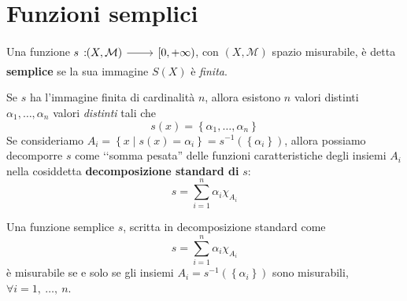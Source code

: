 \section{Funzioni semplici}
\begin{define}
Una funzione $\funz{s}{\left(X,\mathcal{M}\right)}{\left[0,+\infty\right)}$, con $\left(X,\mathcal{M}\right)$ spazio misurabile, è detta \textbf{semplice} se la sua immagine $S(X)$ è \textit{finita}.
\end{define}
Se $s$ ha l'immagine finita di cardinalità $n$, allora esistono $n$ valori distinti $\alpha_1,\ldots,\alpha_n$  valori \textit{distinti} tali che
\begin{equation*}
	s(x)=\left\{\alpha_1,\ldots,\alpha_n\right\}
\end{equation*}
Se consideriamo $A_i=\left\{x\mid s(x)=\alpha_i\right\}=s^{-1}\left(\left\{\alpha_i\right\}\right)$, allora possiamo decomporre $s$ come ‘‘somma pesata'' delle funzioni caratteristiche degli insiemi $A_i$ nella cosiddetta \textbf{decomposizione standard di }$s$:
\begin{equation}
	s=\sum_{i=1}^{n}\alpha_i\chi_{A_i}
\end{equation}
\begin{proposition}
	Una funzione semplice $s$, scritta in decomposizione standard come
	\begin{equation*}
		s=\sum_{i=1}^{n}\alpha_i\chi_{A_i}
	\end{equation*}
	è misurabile se e solo se gli insiemi $A_i=s^{-1}\left(\left\{\alpha_i\right\}\right)$ sono misurabili, $\forall i=1,\ \ldots,\ n$. 
\end{proposition}
